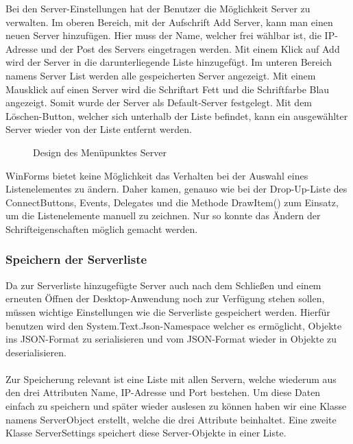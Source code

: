 Bei den Server-Einstellungen hat der Benutzer die Möglichkeit Server zu verwalten.
Im oberen Bereich, mit der Aufschrift Add Server, kann man einen neuen Server hinzufügen. Hier muss der Name, welcher frei wählbar ist, die IP-Adresse und der Post des Servers eingetragen werden. Mit einem Klick auf Add wird der Server in die darunterliegende Liste hinzugefügt. Im unteren Bereich namens Server List werden alle gespeicherten Server angezeigt. Mit einem Mausklick auf einen Server wird die Schriftart Fett und die Schriftfarbe Blau angezeigt. Somit wurde der Server als Default-Server festgelegt. Mit dem Löschen-Button, welcher sich unterhalb der Liste befindet, kann ein ausgewählter Server wieder von der Liste entfernt werden.
\\
\begin{figure}[H]
    \centering
    \setlength{\fboxsep}{1pt}
	\setlength{\fboxrule}{1pt}
    \caption[Design des Menüpunktes Server]{Design des Menüpunktes Server} 
\end{figure}
\noindent
WinForms bietet keine Möglichkeit das Verhalten bei der Auswahl eines Listenelementes zu ändern. Daher kamen, genauso wie bei der Drop-Up-Liste des ConnectButtons, Events, Delegates und die Methode DrawItem() zum Einsatz, um die Listenelemente manuell zu zeichnen. Nur so konnte das Ändern der Schrifteigenschaften möglich gemacht werden.

\subsubsection{Speichern der Serverliste}
Da zur Serverliste hinzugefügte Server auch nach dem Schließen und einem erneuten Öffnen der Desktop-Anwendung noch zur Verfügung stehen sollen, müssen wichtige Einstellungen wie die Serverliste gespeichert werden. Hierfür benutzen wird den System.Text.Json-Namespace welcher es ermöglicht, Objekte ins JSON-Format zu serialisieren und vom JSON-Format wieder in Objekte zu deserialisieren.
\\ \ \\
Zur Speicherung relevant ist eine Liste mit allen Servern, welche wiederum aus den drei Attributen Name, IP-Adresse und Port bestehen. Um diese Daten einfach zu speichern und später wieder auslesen zu können haben wir eine Klasse namens ServerObject erstellt, welche die drei Attribute beinhaltet. Eine zweite Klasse ServerSettings speichert diese Server-Objekte in einer Liste.

